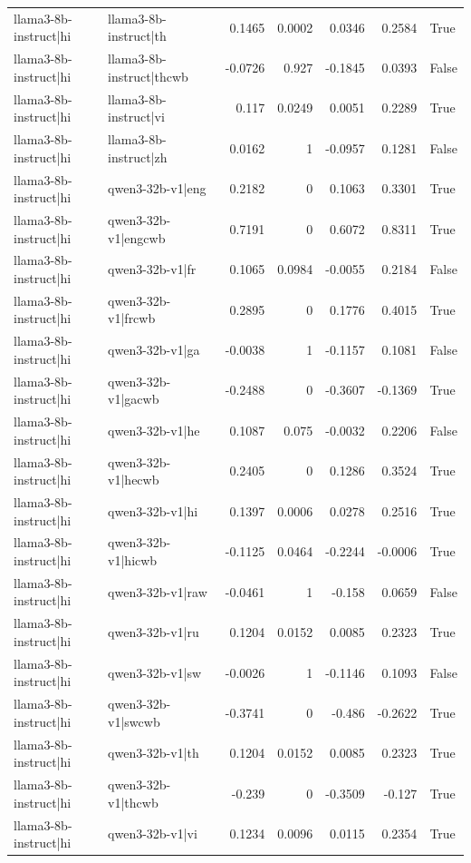 \begin{table}
\begin{tabular}{l l r r r r l}
llama3-8b-instruct|hi & llama3-8b-instruct|th & 0.1465 & 0.0002 & 0.0346 & 0.2584 & True \\
llama3-8b-instruct|hi & llama3-8b-instruct|thcwb & -0.0726 & 0.927 & -0.1845 & 0.0393 & False \\
llama3-8b-instruct|hi & llama3-8b-instruct|vi & 0.117 & 0.0249 & 0.0051 & 0.2289 & True \\
llama3-8b-instruct|hi & llama3-8b-instruct|zh & 0.0162 & 1 & -0.0957 & 0.1281 & False \\
llama3-8b-instruct|hi & qwen3-32b-v1|eng & 0.2182 & 0 & 0.1063 & 0.3301 & True \\
llama3-8b-instruct|hi & qwen3-32b-v1|engcwb & 0.7191 & 0 & 0.6072 & 0.8311 & True \\
llama3-8b-instruct|hi & qwen3-32b-v1|fr & 0.1065 & 0.0984 & -0.0055 & 0.2184 & False \\
llama3-8b-instruct|hi & qwen3-32b-v1|frcwb & 0.2895 & 0 & 0.1776 & 0.4015 & True \\
llama3-8b-instruct|hi & qwen3-32b-v1|ga & -0.0038 & 1 & -0.1157 & 0.1081 & False \\
llama3-8b-instruct|hi & qwen3-32b-v1|gacwb & -0.2488 & 0 & -0.3607 & -0.1369 & True \\
llama3-8b-instruct|hi & qwen3-32b-v1|he & 0.1087 & 0.075 & -0.0032 & 0.2206 & False \\
llama3-8b-instruct|hi & qwen3-32b-v1|hecwb & 0.2405 & 0 & 0.1286 & 0.3524 & True \\
llama3-8b-instruct|hi & qwen3-32b-v1|hi & 0.1397 & 0.0006 & 0.0278 & 0.2516 & True \\
llama3-8b-instruct|hi & qwen3-32b-v1|hicwb & -0.1125 & 0.0464 & -0.2244 & -0.0006 & True \\
llama3-8b-instruct|hi & qwen3-32b-v1|raw & -0.0461 & 1 & -0.158 & 0.0659 & False \\
llama3-8b-instruct|hi & qwen3-32b-v1|ru & 0.1204 & 0.0152 & 0.0085 & 0.2323 & True \\
llama3-8b-instruct|hi & qwen3-32b-v1|sw & -0.0026 & 1 & -0.1146 & 0.1093 & False \\
llama3-8b-instruct|hi & qwen3-32b-v1|swcwb & -0.3741 & 0 & -0.486 & -0.2622 & True \\
llama3-8b-instruct|hi & qwen3-32b-v1|th & 0.1204 & 0.0152 & 0.0085 & 0.2323 & True \\
llama3-8b-instruct|hi & qwen3-32b-v1|thcwb & -0.239 & 0 & -0.3509 & -0.127 & True \\
llama3-8b-instruct|hi & qwen3-32b-v1|vi & 0.1234 & 0.0096 & 0.0115 & 0.2354 & True \\

\end{tabular}
\end{table}
